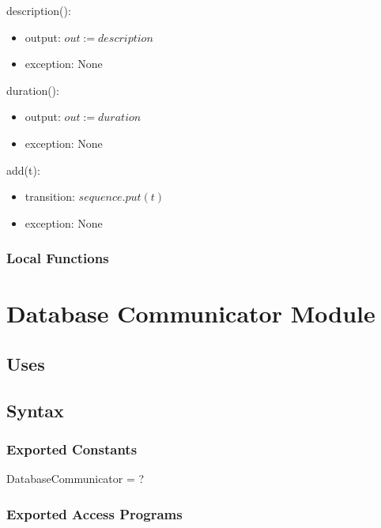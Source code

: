 \documentclass[12pt, titlepage]{article}
\begin{document}
description():
\begin{itemize}
	\item output: $out := description$
	\item exception: None
\end{itemize}

duration():
\begin{itemize}
	\item output: $out := duration$
	\item exception: None
\end{itemize}

add(t):
\begin{itemize}
	\item transition: $sequence.put(t)$
	\item exception: None
\end{itemize}

\subsubsection{Local Functions}

\newpage

\section{Database Communicator Module}

\subsection{Uses}

\subsection{Syntax}

\subsubsection{Exported Constants}
DatabaseCommunicator = ?
\subsubsection{Exported Access Programs}
\end{document}
